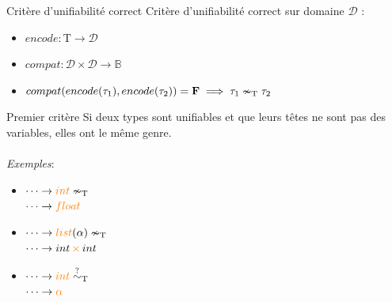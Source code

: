 \documentclass[serif]{beamer}
\newcommand{\exemples}{\textit{Exemples}\xspace}
\newcommand{\T}{\mathrm{T}}
\begin{document}
%


\begin{frame}{Critère d'unifiabilité correct}
Critère d'unifiabilité correct sur domaine $\mathscr{D}$ :
\begin{itemize}
  \item $encode : \T \rightarrow \mathscr{D}$
  \item $compat : \mathscr{D} \times \mathscr{D} \rightarrow \mathbb{B}$
  \item $compat (encode (\tau_1), encode (\tau_2)) = \bold{F} \implies \tau_1 \nsim_\T \tau_2$
\end{itemize}
\end{frame}


\begin{frame}{Premier critère}
Si deux types sont unifiables et que leurs têtes ne sont pas des variables, elles ont le même genre.
\\~\\
\exemples :
\begin{itemize}
  \item 
    $\dots \rightarrow \textcolor{orange}{int} \nsim_\T$ \\
    $\dots \rightarrow \textcolor{orange}{float}$
  \item
    $\dots \rightarrow \textcolor{orange}{list} (\alpha) \nsim_\T$ \\
    $\dots \rightarrow int \,\textcolor{orange}{\times}\, int$
  \item
    $\dots \rightarrow \textcolor{orange}{int} \stackrel{?}{\sim}_\T$ \\
    $\dots \rightarrow \textcolor{orange}{\alpha}$
\end{itemize}
\end{frame}
\end{document}
